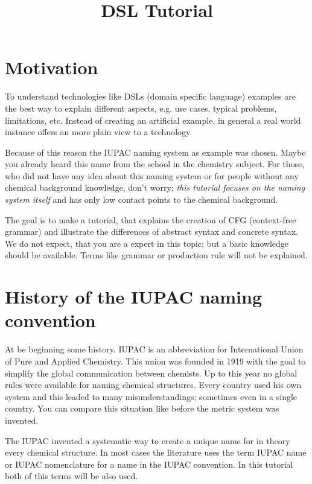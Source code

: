 \documentclass[a4paper,10pt]{article}
\title{DSL Tutorial}
\author{}
\newcommand{\gerquot}[1]{\glqq#1\grqq}
\newcommand{\dashAndSpace}{\textendash \space}
\newcommand{\dashAndSpaceSeq}[1]{\dashAndSpace#1 \textendash}
\newcommand{\DSL}{domain specific language}
\newcommand{\CFG}{context-free grammar}
\newcommand{\IUPAC}{International Union of Pure and Applied Chemistry}
\begin{document}
\maketitle

\section{Motivation}\label{s:Motivation}
To understand technologies like DSLs (\DSL) examples are the best way to explain different aspects, e.g. use cases, typical problems, limitations, etc. Instead of creating an artificial example, in general a real world instance offers an more plain view to a technology.

Because of this reason the IUPAC naming system as example was chosen. Maybe you already heard this name from the school in the chemistry subject. For those, who did not have any idea about this naming system or for people without any chemical background knowledge, don't worry; \emph{this tutorial focuses on the naming system itself} and has only low contact points to the chemical background.

The goal is to make a tutorial, that explains the creation of CFG (\CFG) and illustrate the differences of abstract syntax and concrete syntax. We do not expect, that you are a expert in this topic; but a basic knowledge should be available. Terms like \gerquot{grammar} or \gerquot{production rule} will not be explained.



\section{History of the IUPAC naming convention}\label{s:HistoryOfTheIUPACNamingConvention}
At be beginning some history. IUPAC is an abbreviation for \gerquot{\IUPAC}. This union was founded in 1919 with the goal to simplify the global communication between chemists. Up to this year no global rules were available for naming chemical structures. Every country used his own system and this leaded to many misunderstandings; sometimes even in a single country. You can compare this situation like before the metric system was invented.

The IUPAC invented a systematic way to create a unique name for \dashAndSpaceSeq{in theory} every chemical structure. In most cases the literature uses the term \gerquot{IUPAC name} or \gerquot{IUPAC nomenclature} for a name in the IUPAC convention. In this tutorial both of this terms will be also used.
\end{document}
